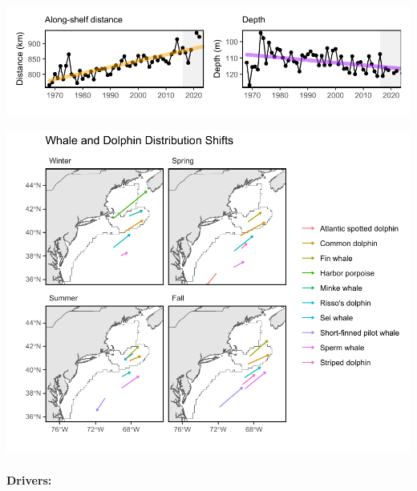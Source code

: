\documentclass[
  10pt,
]{article}
\let\origfigure\figure
\let\endorigfigure\endfigure
\renewenvironment{figure}[1][2] {
    \expandafter\origfigure\expandafter[H]
} {
    \endorigfigure
}
\begin{document}
\begin{figure}

{\centering \includegraphics{midatlantic_files/figure-latex/species-dist-1} 

}

\caption{Aggregate species distribution metrics for species in the Northeast Large Marine Ecosystem: along shelf distance with increasing trend (orange), and depth with decreasing trend indicating deeper water (purple).}\label{fig:species-dist}
\end{figure}

\begin{figure}

{\centering \includegraphics{midatlantic_files/figure-latex/protectedspp-dist-shifts-1} 

}

\caption{Direction and magnitude of core habitat shifts, represented by the length of the line of the seasonal weighted centroid for species with more than 70 km difference between 2010 and 2017 (tip of arrow).}\label{fig:protectedspp-dist-shifts}
\end{figure}

\paragraph{Drivers:}\label{drivers}
\end{document}
